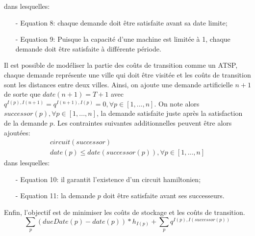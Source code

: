 		dans lesquelles:
		\begin{itemize}
			\item[-] Equation 8: chaque demande doit être satisfaite avant sa date limite;
			\item[-] Equation 9: Puisque la capacité d'une machine est limitée à 1, chaque demande doit être satisfaite à différente période.
		\end{itemize}
		Il est possible de modéliser la partie des coûts de transition comme un ATSP, chaque demande représente une ville qui doit être visitée et les coûts de transition sont les distances entre deux villes. Ainsi, on ajoute une demande artificielle $n+1$ de sorte que $date(n+1) = T+1$ avec $q^{I(p), I(n+1)} = q^{I(n+1), I(p)} = 0, \forall p \in [1,...,n]$. On note alors $successor(p), \forall p \in [1,...,n]$, la demande satisfaite juste après la satisfaction de la demande $p$. Les contraintes suivantes additionnelles peuvent être alors ajoutées:
		\begin{eqnarray}
			circuit(successor) \\
			date(p) \leq date(successor(p)), \forall p \in [1,...,n]
		\end{eqnarray}
		dans lesquelles:
		\begin{itemize}
			\item[-] Equation 10: il garantit l'existence d'un circuit hamiltonien;
			\item[-] Equation 11: la demande $p$ doit être satisfaite avant ses successeurs.
		\end{itemize}
		
		Enfin, l'objectif est de minimiser les coûts de stockage et les coûts de transition.
		\[
			\sum_{p}{(dueDate(p)-date(p))} * h_{I(p)} + \sum_{p}{q^{I(p),I(successor(p))}}
		\]
		
	

